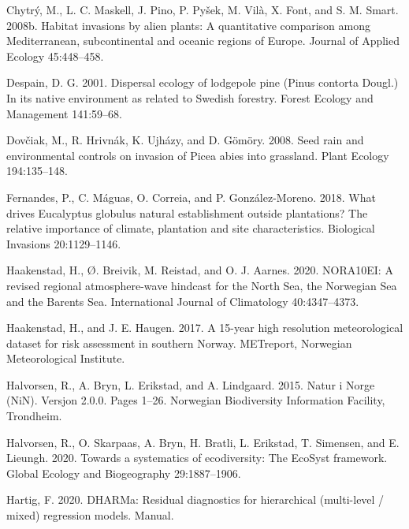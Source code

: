 \documentclass[
]{article}
\begin{document}
\leavevmode\hypertarget{ref-chytryHabitatInvasionsAlien2008}{}%
Chytrý, M., L. C. Maskell, J. Pino, P. Pyšek, M. Vilà, X. Font, and S. M. Smart. 2008b. Habitat invasions by alien plants: A quantitative comparison among Mediterranean, subcontinental and oceanic regions of Europe. Journal of Applied Ecology 45:448--458.

\leavevmode\hypertarget{ref-despainDispersalEcologyLodgepole2001}{}%
Despain, D. G. 2001. Dispersal ecology of lodgepole pine (Pinus contorta Dougl.) In its native environment as related to Swedish forestry. Forest Ecology and Management 141:59--68.

\leavevmode\hypertarget{ref-dovciakSeedRainEnvironmental2008}{}%
Dovčiak, M., R. Hrivnák, K. Ujházy, and D. Gömöry. 2008. Seed rain and environmental controls on invasion of Picea abies into grassland. Plant Ecology 194:135--148.

\leavevmode\hypertarget{ref-fernandesWhatDrivesEucalyptus2018}{}%
Fernandes, P., C. Máguas, O. Correia, and P. González-Moreno. 2018. What drives Eucalyptus globulus natural establishment outside plantations? The relative importance of climate, plantation and site characteristics. Biological Invasions 20:1129--1146.

\leavevmode\hypertarget{ref-haakenstadNORA10EIRevisedRegional2020}{}%
Haakenstad, H., Ø. Breivik, M. Reistad, and O. J. Aarnes. 2020. NORA10EI: A revised regional atmosphere-wave hindcast for the North Sea, the Norwegian Sea and the Barents Sea. International Journal of Climatology 40:4347--4373.

\leavevmode\hypertarget{ref-haakenstad15yearHighResolution2017}{}%
Haakenstad, H., and J. E. Haugen. 2017. A 15-year high resolution meteorological dataset for risk assessment in southern Norway. METreport, Norwegian Meteorological Institute.

\leavevmode\hypertarget{ref-halvorsenNaturNorgeNiN2015}{}%
Halvorsen, R., A. Bryn, L. Erikstad, and A. Lindgaard. 2015. Natur i Norge (NiN). Versjon 2.0.0. Pages 1--26. Norwegian Biodiversity Information Facility, Trondheim.

\leavevmode\hypertarget{ref-halvorsenSystematicsEcodiversityEcoSyst2020}{}%
Halvorsen, R., O. Skarpaas, A. Bryn, H. Bratli, L. Erikstad, T. Simensen, and E. Lieungh. 2020. Towards a systematics of ecodiversity: The EcoSyst framework. Global Ecology and Biogeography 29:1887--1906.

\leavevmode\hypertarget{ref-hartigDHARMaResidualDiagnostics2020}{}%
Hartig, F. 2020. DHARMa: Residual diagnostics for hierarchical (multi-level / mixed) regression models. Manual.
\end{document}
